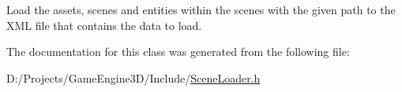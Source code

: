 Load the assets, scenes and entities within the scenes with the given path to the X\+ML file that contains the data to load. 

The documentation for this class was generated from the following file\+:\begin{DoxyCompactItemize}
\item 
D\+:/\+Projects/\+Game\+Engine3\+D/\+Include/\mbox{\hyperlink{_scene_loader_8h}{Scene\+Loader.\+h}}\end{DoxyCompactItemize}
